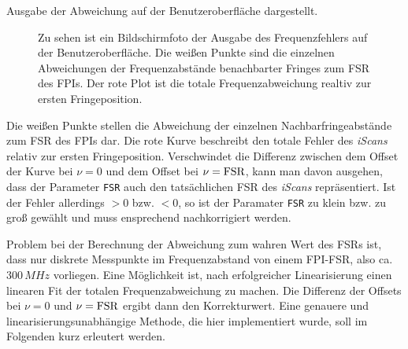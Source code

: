 Ausgabe der Abweichung auf der Benutzeroberfläche dargestellt.
\begin{figure}[h]
 	\centering
	\caption[Benutzeroberfläche Linearisierung -
	Frequenzfehler]{Zu sehen ist ein Bildschirmfoto der Ausgabe	des Frequenzfehlers
	auf der Benutzeroberfläche. Die weißen Punkte sind die einzelnen Abweichungen
	der Frequenzabstände benachbarter Fringes zum FSR des FPIs. Der rote Plot ist
	die totale Frequenzabweichung realtiv zur ersten Fringeposition.}
	\label{fig:linearisierung_benutzeroberflaeche_frequenz-abweichung}
\end{figure}
Die weißen Punkte stellen die Abweichung der einzelnen Nachbarfringeabstände zum
FSR des FPIs dar. Die rote Kurve beschreibt den totale Fehler des
\textit{iScans} relativ zur ersten Fringeposition. Verschwindet die Differenz
zwischen dem Offset der Kurve bei $\nu=0$ und dem Offset bei
$\nu=\text{\lstinline|FSR|}$, kann man davon ausgehen, dass der Parameter
\lstinline|FSR| auch den tatsächlichen FSR des \textit{iScans} repräsentiert.
Ist der Fehler allerdings $>0$ bzw. $<0$, so
ist der Paramater \lstinline|FSR| zu klein bzw. zu groß gewählt und muss
ensprechend nachkorrigiert werden.\par
Problem bei der Berechnung der Abweichung
zum wahren Wert des FSRs ist, dass nur diskrete Messpunkte im Frequenzabstand
von einem FPI-FSR, also ca. $300\,MHz$ vorliegen. Eine Möglichkeit ist, nach
erfolgreicher Linearisierung einen linearen Fit der totalen Frequenzabweichung
zu machen. Die Differenz der Offsets bei $\nu=0$ und
$\nu=\text{\lstinline|FSR|}$ ergibt dann den Korrekturwert. Eine genauere und
linearisierungsunabhängige Methode, die hier implementiert wurde, soll im
Folgenden kurz erleutert werden.\par
